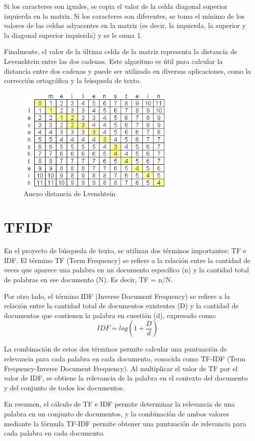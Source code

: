 \documentclass{article}
\begin{document}
Si los caracteres son iguales, se copia el valor de la celda diagonal superior izquierda en la matriz. Si los caracteres son diferentes, se toma el mínimo de los valores de las celdas adyacentes en la matriz (es decir, la izquierda, la superior y la diagonal superior izquierda) y se le suma 1.

Finalmente, el valor de la última celda de la matriz representa la distancia de Levenshtein entre las dos cadenas. Este algoritmo es útil para calcular la distancia entre dos cadenas y puede ser utilizado en diversas aplicaciones, como la corrección ortográfica y la búsqueda de texto.
\begin{figure}[h]
    \centering
	\includegraphics[width=0.68\textwidth]{Anexo1.png}
    \caption{Anexo distancia de Lvenshtein}
    \label{img:3}
\end{figure}

\section*{TFIDF }
En el proyecto de búsqueda de texto, se utilizan dos términos importantes: TF e IDF. El término TF (Term Frequency) se refiere a la relación entre la cantidad de veces que aparece una palabra en un documento específico (n) y la cantidad total de palabras en ese documento (N). Es decir, TF = n/N.

Por otro lado, el término IDF (Inverse Document Frequency) se refiere a la relación entre la cantidad total de documentos existentes (D) y la cantidad de documentos que contienen la palabra en cuestión (d), expresado como:
\begin{equation}
IDF = log(1 + \frac{D}{d})
\end{equation}

La combinación de estos dos términos permite calcular una puntuación de relevancia para cada palabra en cada documento, conocida como TF-IDF (Term Frequency-Inverse Document Frequency). Al multiplicar el valor de TF por el valor de IDF, se obtiene la relevancia de la palabra en el contexto del documento y del conjunto de todos los documentos.

En resumen, el cálculo de TF e IDF permite determinar la relevancia de una palabra en un conjunto de documentos, y la combinación de ambos valores mediante la fórmula TF-IDF permite obtener una puntuación de relevancia para cada palabra en cada documento.
\end{document}
